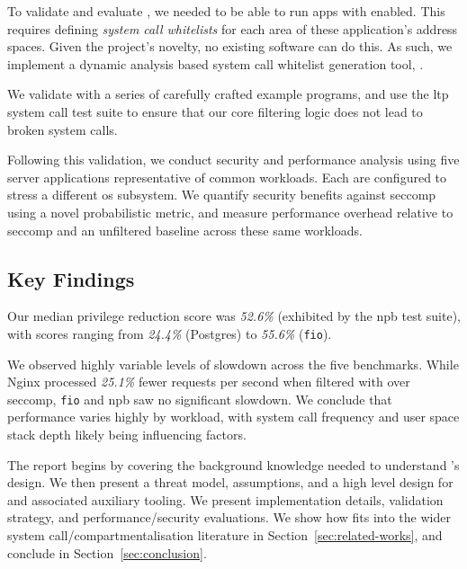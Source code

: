 To validate and evaluate \af, we needed to be able to run apps with \af enabled.
This requires defining \textit{system call whitelists} for each area of these
application's address spaces. Given the project's novelty, no existing
software can do this. As such, we implement a dynamic analysis based
system call whitelist generation tool, \afgen.

We validate \af with a series of carefully crafted example
programs, and use the \ac{ltp} system call test suite to ensure that our core
filtering logic does not lead to broken system calls.  

Following this validation, we conduct security and performance analysis
using five server applications representative of common workloads. Each are
configured to  stress a different \ac{os} subsystem. We quantify security
benefits against  seccomp using a novel probabilistic metric, and
measure performance overhead relative to seccomp and an unfiltered baseline
across these same workloads. 

\subsection{Key Findings}

Our median privilege reduction score was \textit{52.6\%} (exhibited by the
\ac{npb} test suite), with scores ranging from \textit{24.4\%} (Postgres) to
\textit{55.6\%} (\texttt{fio}).

We observed highly variable levels of slowdown across the five benchmarks. While
Nginx processed \textit{25.1\%} fewer requests per second when filtered with \af
over seccomp, \texttt{fio} and \ac{npb} saw no significant slowdown. We conclude
that performance varies highly by workload, with system call frequency and
user space stack depth likely being influencing factors.

The report begins by covering the background knowledge needed to understand
\af's design. We then present a threat model, assumptions, and a high level
design for \af and associated auxiliary tooling. We present implementation
details, validation strategy, and performance/security evaluations. We show how
\af fits into the wider system call/compartmentalisation literature in
Section~\ref{sec:related-works}, and conclude in Section~\ref{sec:conclusion}.
